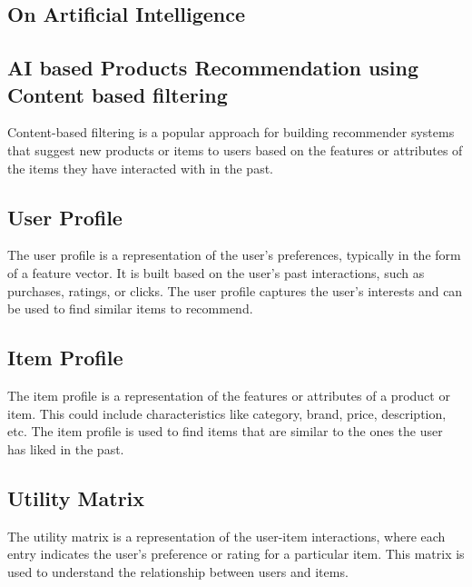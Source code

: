 \documentclass[12pt, a4paper, oneside]{article}
\begin{document}
  
     
   

\break


\subsection{On Artificial Intelligence}



\subsection*{AI based Products Recommendation using
  Content based filtering }


Content-based filtering is a popular approach for building recommender systems that suggest new products or items to users based on the features or attributes of the items they have interacted with in the past.



\subsection*{User Profile}

The user profile is a representation of the user's preferences, typically in the form of a feature vector. It is built based on the user's past interactions, such as purchases, ratings, or clicks. The user profile captures the user's interests and can be used to find similar items to recommend.

\subsection*{Item Profile}

The item profile is a representation of the features or attributes of a product or item. This could include characteristics like category, brand, price, description, etc. The item profile is used to find items that are similar to the ones the user has liked in the past.

\subsection*{Utility Matrix}

The utility matrix is a representation of the user-item interactions, where each entry indicates the user's preference or rating for a particular item. This matrix is used to understand the relationship between users and items.
\end{document}
